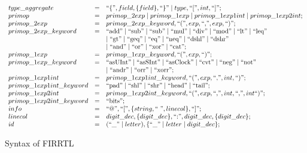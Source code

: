 {\begin{figure}[t]
{\[\begin{array}{l l l}
  type\_aggregate & = & \mbox{``\{''}, field, \{field\}, \mbox{``\}''} \mid type, \mbox{``[''}, int, \mbox{``]''};\\
%
primop & = & primop\_2exp \mid primop\_1exp \mid primop\_1exp1int \mid primop\_1exp2int; \\
primop\_2exp & = & primop\_2exp\_keyword, \mbox{``(''} , exp, \mbox{``,''} , exp, \mbox{``)''}; \\
%
primop\_2exp\_keyword & = &  \mbox{``add''}  \mid  \mbox{``sub''}  \mid  \mbox{``sub''} \mid \mbox{``mul''} \mid \mbox{``div''} \mid \mbox{``mod''} \mid \mbox{``lt''} \mid \mbox{``leq''}  \\
& &  \mid \mbox{``gt''} \mid \mbox{``geq''} \mid \mbox{``eq''} \mid \mbox{``neq''} \mid \mbox{``dshl''}  \mid \mbox{``dshr''} \\
 & & \mid \mbox{``and''} \mid \mbox{``or''} \mid \mbox{``xor''} \mid \mbox{``cat''}; \\
primop\_1exp & = & primop\_1exp\_keyword, \mbox{``(''}, exp, \mbox{``)''}; \\
primop\_1exp\_keyword & = & \mbox{``asUInt''} \mid \mbox{``asSInt''} \mid \mbox{``asClock''} \mid \mbox{``cvt''} \mid \mbox{``neg''} \mid \mbox{``not''}  \\
& & \mid \mbox{``andr''} \mid \mbox{``orr''} \mid  \mbox{``xorr''};\\
%
primop\_1exp1int & = & primop\_1exp1int\_keyword, \mbox{``(''}, exp, \mbox{``,''}, int, \mbox{``)''}; \\
primop\_1exp1int\_keyword & = & \mbox{``pad''} \mid \mbox{``shl''} \mid \mbox{``shr''} \mid \mbox{``head''} \mid \mbox{``tail''}; \\
primop\_1exp2int & = & primop\_1exp2int\_keyword, \mbox{``(''}, exp, \mbox{``,''}, int, \mbox{``,''}, int \mbox{``)''}; \\
primop\_1exp2int\_keyword & = & \mbox{``bits''}; \\
%
info & = & \mbox{``@''}, \mbox{``[''}, \{string, \mbox{`` ''}, linecol\}, \mbox{``]''};\\
linecol & = &  digit\_dec, \{digit\_dec\}, \mbox{``:''}, digit\_dec, \{digit\_dec\};\\
id & = & ( \mbox{``\_''} \mid letter), \{ \mbox{``\_''} \mid letter \mid digit\_dec\};
%
\end{array}
\]
}
\caption{Syntax of FIRRTL}
\label{fig-firrtl-synt}
\end{figure}


}